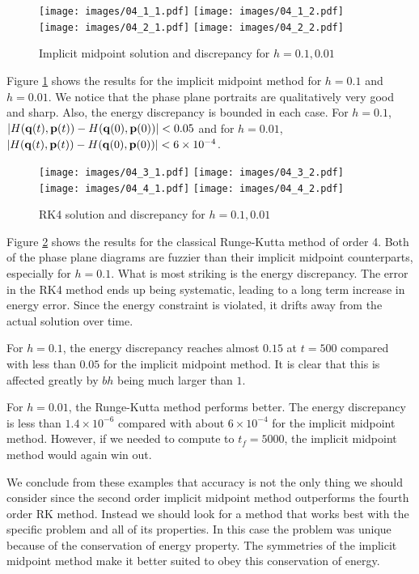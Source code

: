 \FloatBarrier

\begin{solution}
  \begin{figure}[h!]
    \centering
    \texttt{[image: images/04\_1\_1.pdf]}
    \texttt{[image: images/04\_1\_2.pdf]}
    \texttt{[image: images/04\_2\_1.pdf]}
    \texttt{[image: images/04\_2\_2.pdf]}
    \caption{Implicit midpoint solution and discrepancy for $h = 0.1, 0.01$}
    \label{F:04_1}
    
  \end{figure}
  Figure \ref{F:04_1} shows the results for the implicit midpoint method for $h = 0.1$ and $h = 0.01$. We notice that the phase plane portraits are qualitatively very good and sharp. Also, the energy discrepancy is bounded in each case. For $h = 0.1$, $|H(\mathbf{q}(t), \mathbf{p}(t)) - H( \mathbf{q}(0),\mathbf{p}(0))| < 0.05$ and for $h = 0.01$, $|H(\mathbf{q}(t), \mathbf{p}(t)) - H( \mathbf{q}(0),\mathbf{p}(0))| < 6 \times 10^{-4}$.
  
  \FloatBarrier
  
  \begin{figure}[h!]
    \centering
    \texttt{[image: images/04\_3\_1.pdf]}
    \texttt{[image: images/04\_3\_2.pdf]}
    \texttt{[image: images/04\_4\_1.pdf]}
    \texttt{[image: images/04\_4\_2.pdf]}
    \caption{RK4 solution and discrepancy for $h = 0.1, 0.01$}
    \label{F:04_2}
  \end{figure}
  
  Figure \ref{F:04_2} shows the results for the classical Runge-Kutta method of order 4. Both of the phase plane diagrams are fuzzier than their implicit midpoint counterparts, especially for $h = 0.1$. What is most striking is the energy discrepancy. The error in the RK4 method ends up being systematic, leading to a long term increase in energy error. Since the energy constraint is violated, it drifts away from the actual solution over time.
  
  \FloatBarrier
  
  For $h = 0.1$, the energy discrepancy reaches almost $0.15$ at $t = 500$ compared with less than $0.05$ for the implicit midpoint method. It is clear that this is affected greatly by $bh$ being much larger than $1$.
  
  For $h = 0.01$, the Runge-Kutta method performs better. The energy discrepancy is less than $1.4 \times 10^{-6}$ compared with about $6 \times 10^{-4}$ for the implicit midpoint method. However, if we needed to compute to $t_f = 5000$, the implicit midpoint method would again win out.
  
  We conclude from these examples that accuracy is not the only thing we should consider since the second order implicit midpoint method outperforms the fourth order RK method. Instead we should look for a method that works best with the specific problem and all of its properties. In this case the problem was unique because of the conservation of energy property. The symmetries of the implicit midpoint method make it better suited to obey this conservation of energy.
\end{solution}